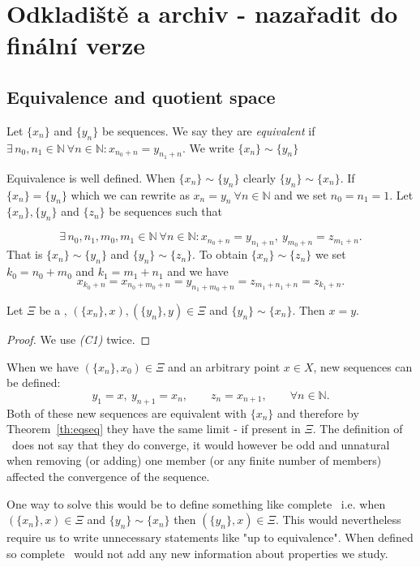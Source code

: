 \chapter{Odkladiště a archiv - nazařadit do finální verze} 

\section{Equivalence and quotient space}

\begin{define}\label{def:ekv}
Let $\{x_n\}$ and $\{y_n\}$ be sequences. We say they are \emph{equivalent} if $\exists\, n_0, n_1 \in \mathbb{N}\ \forall n \in \mathbb{N}: x_{n_0+n}=y_{n_1+n}$. We write $\{x_n\} \sim \{y_n\}$
\end{define}

Equivalence is well defined. When $\{x_n\} \sim \{y_n\}$ clearly $\{y_n\} \sim \{x_n\}$.
If $\{x_n\} = \{y_n\}$ which we can rewrite as $x_n = y_n\ \forall n \in \mathbb{N}$ and we set $n_0 = n_1 = 1$. Let $\{x_n\}, \{y_n\}$ and $\{z_n\}$ be sequences such that

\[
	\exists\, n_0, n_1, m_0, m_1 \in \mathbb{N}\ \forall n \in \mathbb{N}: x_{n_0+n}=y_{n_1+n},\ y_{m_0+n}=z_{m_1+n}.
\]
That is $\{x_n\} \sim \{y_n\}$ and $\{y_n\} \sim \{z_n\}$.  To obtain $\{x_n\} \sim \{z_n\}$ we set $k_0=n_0+m_0$ and $k_1=m_1+n_1$ and we have
\[
	x_{k_0+n}=x_{n_0+m_0+n}=y_{n_1+m_0+n}=z_{m_1+n_1+n}=z_{k_1+n}.
\]


\begin{theorem} \label{th:eqseq}
Let $\Xi$ be a \fcs, $(\{x_n\},x), (\{y_n\},y)\in\Xi$ and $\{y_n\} \sim \{x_n\}$. Then $x=y$.
\end{theorem} 
\begin{proof}
We use \emph{(C1)} twice.
\end{proof}

When we have $(\{x_n\},x_0)\in\Xi$ and an arbitrary point $x\in X$, new sequences can be defined:
\[
	y_1=x,\ y_{n+1}=x_n,\qquad z_n=x_{n+1},\qquad\forall n\in \mathbb{N}.
\]
Both of these new sequences are equivalent with $\{x_n\}$ and therefore by Theorem~\ref{th:eqseq} they have the same limit - if present in $\Xi$. The definition of \fcs\ does not say that they do converge, it would however be odd and unnatural when removing (or adding) one member (or any finite number of members) affected the convergence of the sequence.

One way to solve this would be to define something like complete \fcs\ i.e. when $(\{x_n\},x)\in\Xi$ and $\{y_n\} \sim \{x_n\}$ then $(\{y_n\},x)\in\Xi$. This would nevertheless require us to write unnecessary statements like "up to equivalence". When defined so complete \fcs\ would not add any new information about properties we study.

